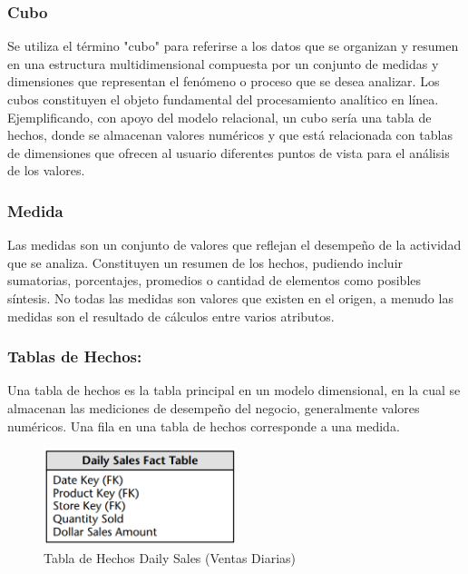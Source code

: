 \subsubsection{Cubo}

Se utiliza el término "cubo" para referirse a los datos que se organizan y resumen en una estructura multidimensional compuesta 
por un conjunto de medidas y dimensiones que representan el fenómeno o proceso que se desea analizar. Los cubos constituyen 
el objeto fundamental del procesamiento analítico en línea\cite{lismaster}. Ejemplificando, con apoyo del modelo relacional, 
un cubo sería una tabla de hechos, donde se almacenan valores numéricos y que est\'a relacionada con tablas de dimensiones 
que ofrecen al usuario diferentes puntos de vista para el análisis de los valores.

\subsubsection{Medida}

Las medidas son un conjunto de valores que reflejan el desempeño de la actividad que se analiza. Constituyen un resumen de los 
hechos\cite{lismaster}, pudiendo incluir sumatorias, porcentajes, promedios o cantidad de elementos como posibles síntesis. 
No todas las medidas son valores que existen en el origen, a menudo las medidas son el resultado de cálculos entre 
varios atributos.

%
\subsubsection{Tablas de Hechos: }
%
Una tabla de hechos es la tabla principal en un modelo dimensional, en la cual se almacenan las mediciones de desempeño del 
negocio, generalmente valores num\'ericos\cite{kimball2011data}. Una fila en una tabla de hechos corresponde a una medida.
%
\begin{figure}[ht]
    \centering
    \includegraphics[width=0.5\textwidth]{../document/Graphics/hechos.png}
    \caption{Tabla de Hechos Daily Sales (Ventas Diarias) \cite{kimball2011data}}
    \label{fig:facts}
  \end{figure}
%

